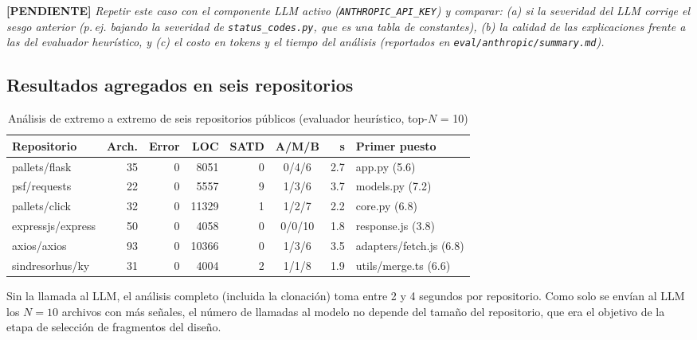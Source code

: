 \textbf{[PENDIENTE]} \textit{Repetir este caso con el componente LLM activo (\texttt{ANTHROPIC\_API\_KEY}) y comparar: (a) si la severidad del LLM corrige el sesgo anterior (p.\,ej. bajando la severidad de \texttt{status\_codes.py}, que es una tabla de constantes), (b) la calidad de las explicaciones frente a las del evaluador heurístico, y (c) el costo en tokens y el tiempo del análisis (reportados en \texttt{eval/anthropic/summary.md}).}

\subsection{Resultados agregados en seis repositorios}

\begin{table}[H]
\centering
\caption{Análisis de extremo a extremo de seis repositorios públicos (evaluador heurístico, top-$N$ = 10)}
\label{tab:eval-repos}
\small
\begin{tabular}{p{} r r r r c r p{}}
\toprule
\textbf{Repositorio} & \textbf{Arch.} & \textbf{Error} & \textbf{LOC} & \textbf{SATD} & \textbf{A/M/B} & \textbf{s} & \textbf{Primer puesto} \\
\midrule
pallets/flask & 35 & 0 & 8051 & 0 & 0/4/6 & 2.7 & app.py (5.6) \\
psf/requests & 22 & 0 & 5557 & 9 & 1/3/6 & 3.7 & models.py (7.2) \\
pallets/click & 32 & 0 & 11329 & 1 & 1/2/7 & 2.2 & core.py (6.8) \\
expressjs/express & 50 & 0 & 4058 & 0 & 0/0/10 & 1.8 & response.js (3.8) \\
axios/axios & 93 & 0 & 10366 & 0 & 1/3/6 & 3.5 & adapters/fetch.js (6.8) \\
sindresorhus/ky & 31 & 0 & 4004 & 2 & 1/1/8 & 1.9 & utils/merge.ts (6.6) \\
\bottomrule
\end{tabular}
\end{table}

Sin la llamada al LLM, el análisis completo (incluida la clonación) toma entre 2 y 4 segundos por repositorio. Como solo se envían al LLM los $N = 10$ archivos con más señales, el número de llamadas al modelo no depende del tamaño del repositorio, que era el objetivo de la etapa de selección de fragmentos del diseño.
